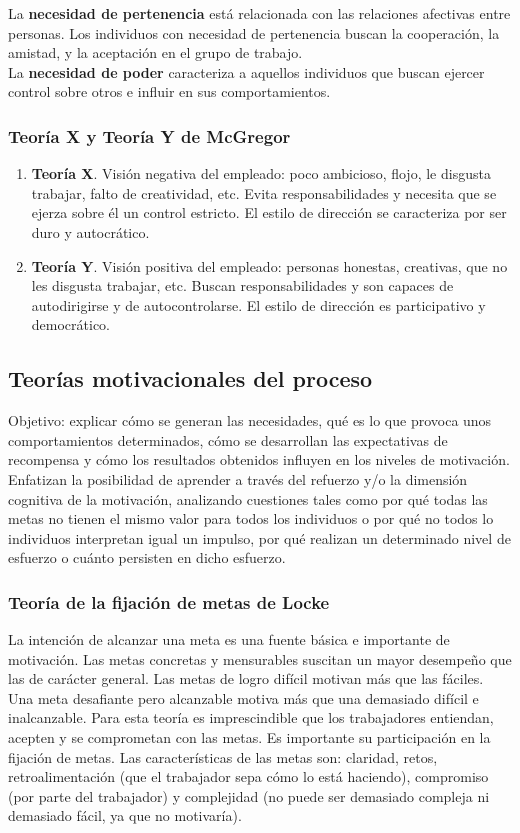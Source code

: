 \documentclass[12pt]{article}
\theoremstyle{definition_wo_parentheses}
\begin{document}
La \textbf{necesidad de pertenencia} está relacionada con las relaciones afectivas entre personas. Los individuos con necesidad de pertenencia buscan la cooperación, la amistad, y la aceptación en el grupo de trabajo.\\

La \textbf{necesidad de poder} caracteriza a aquellos individuos que buscan ejercer control sobre otros e influir en sus comportamientos.

\subsubsection{Teoría X y Teoría Y de McGregor}
\begin{enumerate}
\item \textbf{Teoría X}. Visión negativa del empleado: poco ambicioso, flojo, le disgusta trabajar, falto de creatividad, etc. Evita responsabilidades y necesita que se ejerza sobre él un control estricto. El estilo de dirección se caracteriza por ser duro y autocrático.
\item \textbf{Teoría Y}. Visión positiva del empleado: personas honestas, creativas, que no les disgusta trabajar, etc. Buscan responsabilidades y son capaces de autodirigirse y de autocontrolarse. El estilo de dirección es participativo y democrático.
\end{enumerate}

\subsection{Teorías motivacionales del proceso}
Objetivo: explicar cómo se generan las necesidades, qué es lo que provoca unos comportamientos determinados, cómo se desarrollan las expectativas de recompensa y cómo los resultados obtenidos influyen en los niveles de motivación. Enfatizan la posibilidad de aprender a través del refuerzo y/o la dimensión cognitiva de la motivación, analizando cuestiones tales como por qué todas las metas no tienen el mismo valor para todos los individuos o por qué no todos lo individuos interpretan igual un impulso, por qué realizan un determinado nivel de esfuerzo o cuánto persisten en dicho esfuerzo.

\subsubsection{Teoría de la fijación de metas de Locke}
La intención de alcanzar una meta es una fuente básica e importante de motivación. Las metas concretas y mensurables suscitan un mayor desempeño que las de carácter general. Las metas de logro difícil motivan más que las fáciles. Una meta desafiante pero alcanzable motiva más que una demasiado difícil e inalcanzable. Para esta teoría es imprescindible que los trabajadores entiendan, acepten y se comprometan con las metas. Es importante su participación en la fijación de metas. Las características de las metas son: claridad, retos, retroalimentación (que el trabajador sepa cómo lo está haciendo), compromiso (por parte del trabajador) y complejidad (no puede ser demasiado compleja ni demasiado fácil, ya que no motivaría).
\end{document}
